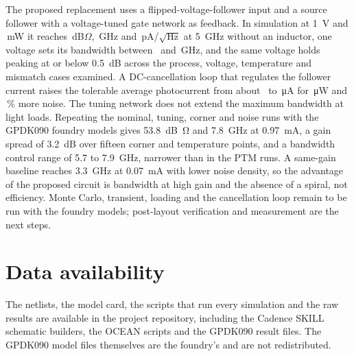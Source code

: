 \documentclass[11pt,a4paper]{article}
\begin{document}
The proposed replacement uses a flipped-voltage-follower input and a source follower with a voltage-tuned gate network as feedback. In simulation at \SI{1}{V} and \PPow\,mW it reaches \PZt\,dB$\Omega$, \PBW\,GHz and \PInFive\,pA/$\sqrt{\text{Hz}}$ at \SI{5}{GHz} without an inductor, one voltage sets its bandwidth between \TuneMin\ and \TuneMax\,GHz, and the same voltage holds peaking at or below \SI{0.5}{dB} across the process, voltage, temperature and mismatch cases examined. A DC-cancellation loop that regulates the follower current raises the tolerable average photocurrent from about \PrLimit\ to \DcLimit\,\si{\micro A} for \DcPowAdd\,\si{\micro W} and \DcNoisePct\,\% more noise. The tuning network does not extend the maximum bandwidth at light loads. Repeating the nominal, tuning, corner and noise runs with the GPDK090 foundry models gives \SI{53.8}{dB\ohm} and \SI{7.8}{GHz} at \SI{0.97}{mA}, a gain spread of \SI{3.2}{dB} over fifteen corner and temperature points, and a bandwidth control range of \SI{5.7}{} to \SI{7.9}{GHz}, narrower than in the PTM runs. A same-gain baseline reaches \SI{3.3}{GHz} at \SI{0.07}{mA} with lower noise density, so the advantage of the proposed circuit is bandwidth at high gain and the absence of a spiral, not efficiency. Monte Carlo, transient, loading and the cancellation loop remain to be run with the foundry models; post-layout verification and measurement are the next steps.

\section*{Data availability}
The netlists, the model card, the scripts that run every simulation and the raw results are available in the project repository, including the Cadence SKILL schematic builders, the OCEAN scripts and the GPDK090 result files. The GPDK090 model files themselves are the foundry's and are not redistributed.
\end{document}
